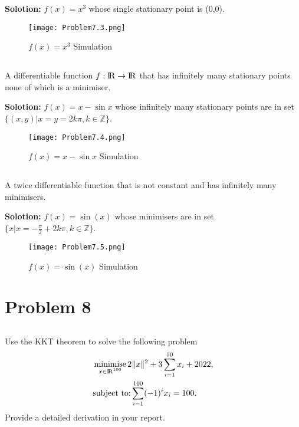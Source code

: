 \documentclass[a4paper,11pt,reqno]{amsart}
\newcommand{\R}{{\rm I\!R}}
\DeclareMathOperator*{\minimise}{minimise}
\begin{document}
\textbf{Solotion:}
$f(x) = x^3$ whose single stationary point is (0,0).
\begin{figure}[H]
    \centering
    \texttt{[image: Problem7.3.png]}
    \caption{$f(x) = x^3$ Simulation}
    \label{f7.3}
    \end{figure}

\subsection{}
A differentiable function $f:\R\rightarrow\R$ that has infinitely many stationary points none of which is
a minimiser.

\textbf{Solotion:}
$f(x) = x-\sin x$ whose infinitely many stationary points are in set $\{(x,y)|x=y=2k\pi,k\in \mathbb{Z}\}$.
\begin{figure}[H]
    \centering
    \texttt{[image: Problem7.4.png]}
    \caption{$f(x) = x-\sin x$ Simulation}
    \label{f7.4}
    \end{figure}

\subsection{}
A twice differentiable function that is not constant and has infinitely many minimisers.

\textbf{Solotion:}
$f(x) = \sin(x)$ whose minimisers are in set $\{x|x=-\frac{\pi}{2}+2k\pi,k\in \mathbb{Z}\}$.
\begin{figure}[H]
    \centering
    \texttt{[image: Problem7.5.png]}
    \caption{$f(x) = \sin(x)$ Simulation}
    \label{f7.2}
    \end{figure}

\section{Problem 8}
\subsection{}
Use the KKT theorem to solve the following problem
\begin{subequations}
    \begin{align}
        &\minimise_{\substack{x\in \R^{100}}}2\|x\|^2+3\sum_{i=1}^{50}x_i+2022,
        \\
        &\text{subject to:}\sum_{i=1}^{100}(-1)^ix_i=100.
    \end{align}
\end{subequations}
Provide a detailed derivation in your report.
\end{document}
